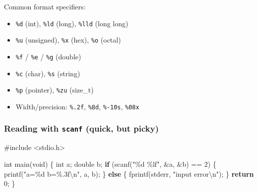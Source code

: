 \documentclass[
  letterpaper,
  DIV=11,
  numbers=noendperiod]{scrreprt}
\newenvironment{Shaded}{\begin{snugshade}}{\end{snugshade}}
\newcommand{\ControlFlowTok}[1]{\textcolor[rgb]{0.00,0.23,0.31}{\textbf{#1}}}
\newcommand{\DataTypeTok}[1]{\textcolor[rgb]{0.68,0.00,0.00}{#1}}
\newcommand{\DecValTok}[1]{\textcolor[rgb]{0.68,0.00,0.00}{#1}}
\newcommand{\ImportTok}[1]{\textcolor[rgb]{0.00,0.46,0.62}{#1}}
\newcommand{\NormalTok}[1]{\textcolor[rgb]{0.00,0.23,0.31}{#1}}
\newcommand{\OperatorTok}[1]{\textcolor[rgb]{0.37,0.37,0.37}{#1}}
\newcommand{\PreprocessorTok}[1]{\textcolor[rgb]{0.68,0.00,0.00}{#1}}
\newcommand{\SpecialCharTok}[1]{\textcolor[rgb]{0.37,0.37,0.37}{#1}}
\newcommand{\StringTok}[1]{\textcolor[rgb]{0.13,0.47,0.30}{#1}}
\providecommand{\tightlist}{%
  \setlength{\itemsep}{0pt}\setlength{\parskip}{0pt}}
\begin{document}
Common format specifiers:

\begin{itemize}
\tightlist
\item
  \texttt{\%d} (int), \texttt{\%ld} (long), \texttt{\%lld} (long long)
\item
  \texttt{\%u} (unsigned), \texttt{\%x} (hex), \texttt{\%o} (octal)
\item
  \texttt{\%f} / \texttt{\%e} / \texttt{\%g} (double)
\item
  \texttt{\%c} (char), \texttt{\%s} (string)
\item
  \texttt{\%p} (pointer), \texttt{\%zu} (size\_t)
\item
  Width/precision: \texttt{\%.2f}, \texttt{\%8d}, \texttt{\%-10s},
  \texttt{\%08x}
\end{itemize}

\subsubsection{\texorpdfstring{Reading with \texttt{scanf} (quick, but
picky)}{Reading with scanf (quick, but picky)}}\label{reading-with-scanf-quick-but-picky}

\begin{Shaded}
\begin{Highlighting}[]
\PreprocessorTok{\#include }\ImportTok{\textless{}stdio.h\textgreater{}}

\DataTypeTok{int}\NormalTok{ main}\OperatorTok{(}\DataTypeTok{void}\OperatorTok{)} \OperatorTok{\{}
    \DataTypeTok{int}\NormalTok{ a}\OperatorTok{;} \DataTypeTok{double}\NormalTok{ b}\OperatorTok{;}
    \ControlFlowTok{if} \OperatorTok{(}\NormalTok{scanf}\OperatorTok{(}\StringTok{"}\SpecialCharTok{\%d}\StringTok{ }\SpecialCharTok{\%lf}\StringTok{"}\OperatorTok{,} \OperatorTok{\&}\NormalTok{a}\OperatorTok{,} \OperatorTok{\&}\NormalTok{b}\OperatorTok{)} \OperatorTok{==} \DecValTok{2}\OperatorTok{)} \OperatorTok{\{}
\NormalTok{        printf}\OperatorTok{(}\StringTok{"a=}\SpecialCharTok{\%d}\StringTok{ b=}\SpecialCharTok{\%.3f\textbackslash{}n}\StringTok{"}\OperatorTok{,}\NormalTok{ a}\OperatorTok{,}\NormalTok{ b}\OperatorTok{);}
    \OperatorTok{\}} \ControlFlowTok{else} \OperatorTok{\{}
\NormalTok{        fprintf}\OperatorTok{(}\NormalTok{stderr}\OperatorTok{,} \StringTok{"input error}\SpecialCharTok{\textbackslash{}n}\StringTok{"}\OperatorTok{);}
    \OperatorTok{\}}
    \ControlFlowTok{return} \DecValTok{0}\OperatorTok{;}
\OperatorTok{\}}
\end{Highlighting}
\end{Shaded}
\end{document}
